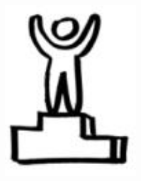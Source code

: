 \documentclass[final]{beamer}
\begin{document}
\begin{frame}[fragile]{}
\begin{columns}[T]
\begin{column}{.49\linewidth}
\begin{block}{}
\begin{columns}
\begin{column}{0.07\columnwidth}
            \includegraphics[width=\columnwidth]{figures/logo-start.png}
          \end{column}
        \end{columns}
      \end{block}


%
    \end{column}

  \end{columns}

\end{frame}
\end{document}
